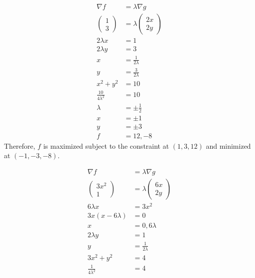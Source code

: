 \documentclass[8pt]{extarticle}
\title{}
\author{Avinash Iyer}
\date{}
\begin{document}
\renewcommand{\arraystretch}{1.5}
  \begin{problem}{15.3}
    \begin{description}[font=\normalfont]
      \item[2:]
        \begin{align*}
          \nabla f &= \lambda \nabla g\\
          \begin{pmatrix}1\\3\end{pmatrix} &= \lambda \begin{pmatrix}2x\\2y\end{pmatrix}\\
          2\lambda x &= 1\\
          2\lambda y &= 3\\
          x &= \frac{1}{2\lambda}\\
          y &= \frac{3}{2\lambda}\\
          x^2 + y^2 &= 10\\
          \frac{10}{4\lambda^2} &= 10\\
          \lambda &= \pm\frac{1}{2}\\
          x &= \pm 1\\
          y &= \pm 3\\
          f &= 12,-8
        \end{align*}
        Therefore, $f$ is maximized subject to the constraint at $(1,3,12)$ and minimized at $(-1,-3,-8)$.
      \item[4:]
        \begin{align*}
          \nabla f &= \lambda \nabla g\\
          \begin{pmatrix}3x^2 \\ 1\end{pmatrix} &= \lambda \begin{pmatrix}6x\\2y\end{pmatrix}\\
          6\lambda x &= 3x^2\\
          3x\left(x - 6\lambda\right) &= 0\\
          x &= 0, 6\lambda\\
          2\lambda y &= 1\\
          y &= \frac{1}{2\lambda}\\
          3x^2 + y^2 &= 4\\
          \frac{1}{4\lambda^2} &= 4 \tag*{$x = 0$}\\

\end{align*}
\end{description}
\end{problem}
\end{document}

